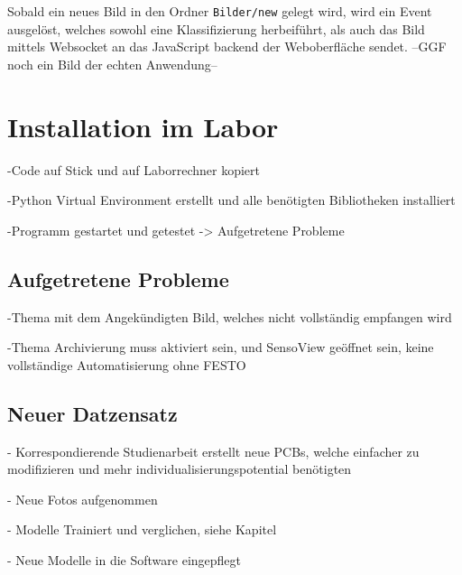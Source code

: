 Sobald ein neues Bild in den Ordner \texttt{Bilder/new} gelegt wird, wird ein Event ausgelöst, welches sowohl eine Klassifizierung herbeiführt, als auch das Bild mittels Websocket an das JavaScript backend der Weboberfläche sendet. --GGF noch ein Bild der echten Anwendung--

\section{Installation im Labor} \label{sec:installation}

-Code auf Stick und auf Laborrechner kopiert

-Python Virtual Environment erstellt und alle benötigten Bibliotheken installiert

-Programm gestartet und getestet
-> Aufgetretene Probleme


\subsection{Aufgetretene Probleme} \label{subsec:aufgetretene_probleme}

-Thema mit dem Angekündigten Bild, welches nicht vollständig empfangen wird 

-Thema Archivierung muss aktiviert sein, und SensoView geöffnet sein, keine vollständige Automatisierung ohne FESTO


\subsection{Neuer Datzensatz} \label{subsec:neuer_datzensatz}

- Korrespondierende Studienarbeit erstellt neue PCBs, welche einfacher zu modifizieren und mehr individualisierungspotential benötigten

- Neue Fotos aufgenommen

- Modelle Trainiert und verglichen, siehe Kapitel 

- Neue Modelle in die Software eingepflegt